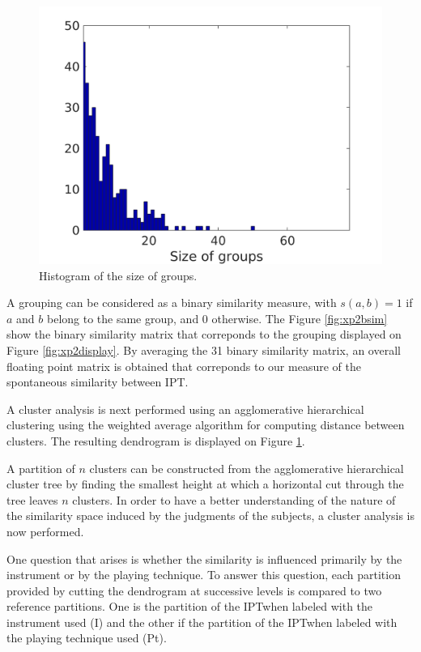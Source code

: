 \documentclass{article}
\newcommand{\ipt}{IPT}
\begin{document}
\begin{figure}
\center
\includegraphics[width = \textwidth]{figures/sbc.png}
\caption{Histogram of the size of groups.}
\label{fig:xp2sizeGroup}
\end{figure}

A grouping can be considered as a binary similarity measure, with $s(a, b) = 1$ if $a$ and $b$ belong to the same group, and $0$ otherwise. The Figure \ref{fig:xp2bsim} show the binary similarity matrix that correponds to the grouping displayed on Figure \ref{fig:xp2display}. By averaging the 31 binary similarity matrix, an overall floating point matrix is obtained that correponds to our measure of the spontaneous similarity between \ipt.

A cluster analysis is next performed using an agglomerative hierarchical clustering using the weighted average algorithm for computing distance between clusters. The resulting dendrogram is displayed on Figure \ref{fig:xp2sizeGroup}.

A partition of $n$ clusters can be constructed from the agglomerative hierarchical cluster tree by finding the smallest height at which a horizontal cut through the tree leaves $n$ clusters. In order to have a better understanding of the nature of the similarity space induced by the judgments of the subjects, a cluster analysis is now performed.

One question that arises is whether the similarity is influenced primarily by the instrument or by the playing technique. To answer this question, each partition provided by cutting the dendrogram at successive levels is compared to two reference partitions. One is the partition of the \ipt when labeled with the instrument used (I) and the other if the partition of the \ipt when labeled with the playing technique used (Pt).
\end{document}
